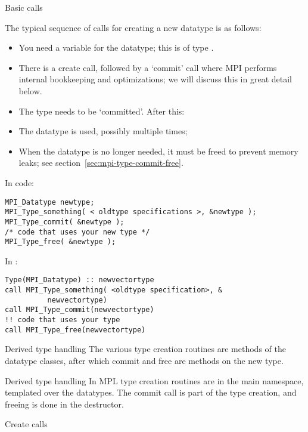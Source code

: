  {Basic calls}
\label{sec:data-commit}

The typical sequence of calls for creating a new datatype is as follows:
\begin{itemize}
\item You need a variable for the datatype;
  this is of type .
\item There is a create call, followed by a `commit' call where MPI
  performs internal bookkeeping and optimizations;
  we will discuss this in great detail below.
\item The type needs to be `committed'. After this:
\item The datatype is used, possibly multiple times;
\item When the datatype is no longer needed, it must be freed to prevent memory leaks;
  see section~\ref{sec:mpi-type-commit-free}.
\end{itemize}
In code:
\begin{lstlisting}
MPI_Datatype newtype;
MPI_Type_something( < oldtype specifications >, &newtype );
MPI_Type_commit( &newtype );
/* code that uses your new type */
MPI_Type_free( &newtype );
\end{lstlisting}

In :
\lstset{language=Fortran}
\begin{lstlisting}
Type(MPI_Datatype) :: newvectortype
call MPI_Type_something( <oldtype specification>, &
          newvectortype)
call MPI_Type_commit(newvectortype)
!! code that uses your type
call MPI_Type_free(newvectortype)
\end{lstlisting}
\lstset{language=C}

\begin{pythonnote}{Derived type handling}
  The various type creation routines are methods
  of the datatype classes, after which commit and free are
  methods on the new type.
\end{pythonnote}

\begin{mplnote}{Derived type handling}
  \label{mpl:derived}
  In \ac{MPL} type creation routines are in the main namespace,
  templated over the datatypes.
  The commit call is part of the type creation,
  and freeing is done in the destructor.
\end{mplnote}

 {Create calls}


